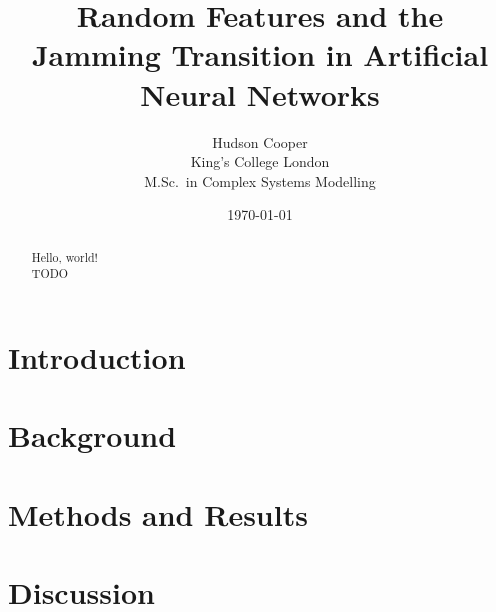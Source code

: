 \documentclass[a4paper, 12pt, titlepage]{article}
\begin{document}
\title{\bf Random Features and the Jamming Transition in Artificial Neural Networks}
\author{
    Hudson Cooper\\
    King's College London\\
    M.Sc.\ in Complex Systems Modelling
}
\date{\today}
\maketitle

\begin{abstract}
    Hello, world!\\
    TODO
\end{abstract}

\section{Introduction}
\lipsum[1]\cite{baity-jesiComparingDynamicsDeep2019}
\section{Background}

\section{Methods and Results}

\section{Discussion}

\printbibliography
\end{document}
